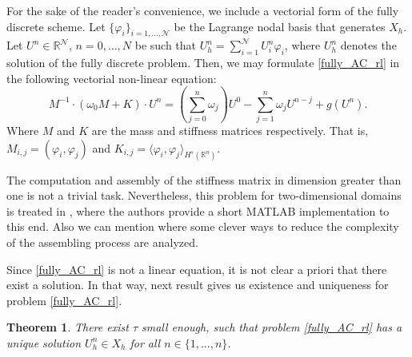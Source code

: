 \documentclass{amsart}
\newcommand{\rn}{{\mathbb{R}^n}}
\newcommand{\w}{\omega}
\newcommand{\fmonio}{g}
\newtheorem{theorem}{Theorem}[section]
\theoremstyle{remark}
\theoremstyle{definition}
\numberwithin{equation}{section}
\begin{document}
For the sake of the reader's convenience, we include a vectorial form of the fully discrete scheme. Let $\{ \varphi_i \}_{i=1,\ldots,\mathcal{N}}$ be the Lagrange nodal basis that generates $X_h$. Let $U^n \in \mathbb{R}^{\mathcal{N}}$, $n=0,\ldots,N$ be such that $U^n_h = \sum_{i=1}^{\mathcal{N}} U^n_i\varphi_i$, where $U_h^n$ denotes the solution of the fully discrete problem. 
Then, we may formulate \eqref{fully_AC_rl} in the following vectorial non-linear equation:
\begin{equation*} 
     M^{-1}\cdot(\w_0 M  +  K) \cdot U^n  =  \left(\sum_{j=0}^{n}\w_j \right)U^{0} - \sum^n_{j=1}\w_jU^{n-j} +  \fmonio(U^n).
\label{full_vect}
\end{equation*}
Where $M$ and $K$ are the mass and stiffness matrices respectively. That is, $M_{i,j} = (\varphi_i,\varphi_j)$ and $K_{i,j} = \langle \varphi_i,\varphi_j \rangle_{H^s(\rn)}$.

 The computation and assembly of the stiffness matrix in dimension greater than one is not a trivial task. Nevertheless, this problem for two-dimensional domains is treated in \cite{ABB}, where the authors provide a short MATLAB implementation to this end. Also we can mention \cite{glusa,KM} where some clever ways to reduce the complexity of the assembling process are analyzed. 
 
Since \eqref{fully_AC_rl} is not a linear equation, it is not clear a priori that there exist a solution. In that way, next result gives us existence and uniqueness for problem \eqref{fully_AC_rl}. 

\begin{theorem}
\label{teo:solucion_fully_dis}
There exist $\tau$ small enough, such that problem \eqref{fully_AC_rl} has  a unique solution $U^n_h \in X_h$ for all $n \in \{1,...,n\}$. 
\end{theorem}     
\end{document}
